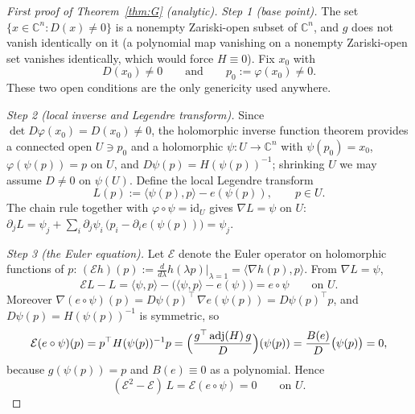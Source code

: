 \documentclass[11pt]{article}
\theoremstyle{plain}
\theoremstyle{definition}
\newcommand{\C}{\mathbb{C}}
\newcommand{\adj}{\operatorname{adj}}
\newcommand{\Eu}{\mathcal{E}}
\begin{document}
\begin{proof}[First proof of Theorem~\ref{thm:G} (analytic)]
\emph{Step 1 (base point).} The set $\{x\in\C^n:D(x)\ne0\}$ is a
nonempty Zariski-open subset of $\C^n$, and $g$ does not vanish
identically on it (a polynomial map vanishing on a nonempty Zariski-open
set vanishes identically, which would force $H\equiv0$). Fix $x_0$ with
\[
D(x_0)\ne0
\qquad\text{and}\qquad
p_0:=\varphi(x_0)\ne0 .
\]
These two open conditions are the only genericity used anywhere.

\emph{Step 2 (local inverse and Legendre transform).} Since
$\det D\varphi(x_0)=D(x_0)\ne0$, the holomorphic inverse function theorem
provides a connected open $U\ni p_0$ and a holomorphic $\psi:U\to\C^n$
with $\psi(p_0)=x_0$, $\varphi(\psi(p))=p$ on $U$, and
$D\psi(p)=H(\psi(p))^{-1}$; shrinking $U$ we may assume $D\ne0$ on
$\psi(U)$. Define the local Legendre transform
\begin{equation}\label{eq:legendre}
L(p):=\langle\psi(p),p\rangle-e(\psi(p)),\qquad p\in U .
\end{equation}
The chain rule together with $\varphi\circ\psi=\mathrm{id}_U$ gives
$\nabla L=\psi$ on $U$:
$\partial_jL=\psi_j+\sum_i\partial_j\psi_i\,
\bigl(p_i-\partial_ie(\psi(p))\bigr)=\psi_j$.

\emph{Step 3 (the Euler equation).} Let $\Eu$ denote the Euler operator
on holomorphic functions of $p$:
$(\Eu h)(p):=\frac{d}{d\lambda}h(\lambda p)\big|_{\lambda=1}
=\langle\nabla h(p),p\rangle$. From $\nabla L=\psi$,
\[
\Eu L-L=\langle\psi,p\rangle-\bigl(\langle\psi,p\rangle-e(\psi)\bigr)
=e\circ\psi
\qquad\text{on }U .
\]
Moreover $\nabla(e\circ\psi)(p)=D\psi(p)^{\top}\,\nabla e(\psi(p))
=D\psi(p)^{\top}p$, and $D\psi(p)=H(\psi(p))^{-1}$ is symmetric, so
\[
\Eu(e\circ\psi)(p)=p^{\top}H(\psi(p))^{-1}p
=\Bigl(\frac{g^{\top}\adj(H)\,g}{D}\Bigr)(\psi(p))
=\frac{B(e)}{D}\bigl(\psi(p)\bigr)=0,
\]
because $g(\psi(p))=p$ and $B(e)\equiv0$ as a polynomial. Hence
\begin{equation}\label{eq:eulerode}
(\Eu^2-\Eu)\,L=\Eu(e\circ\psi)=0\qquad\text{on }U .
\end{equation}


\end{proof}
\end{document}
